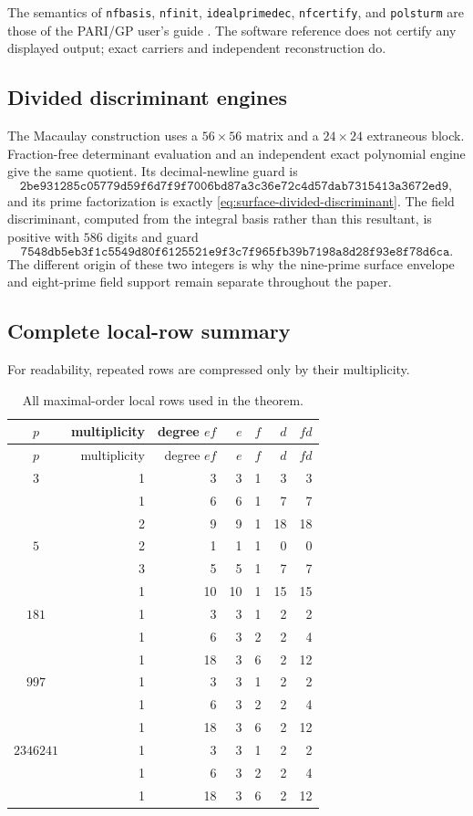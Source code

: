 The semantics of \texttt{nfbasis}, \texttt{nfinit},
\texttt{idealprimedec}, \texttt{nfcertify}, and \texttt{polsturm} are those
of the PARI/GP user's guide \citep{parigroup2021}.  The software reference
does not certify any displayed output; exact carriers and independent
reconstruction do.

\subsection{Divided discriminant engines}

The Macaulay construction uses a $56\times56$ matrix and a $24\times24$
extraneous block.  Fraction-free determinant evaluation and an independent
exact polynomial engine give the same quotient.  Its decimal-newline guard
is
\[
\texttt{2be931285c05779d59f6d7f9f7006bd87a3c36e72c4d57dab7315413a3672ed9},
\]
and its prime factorization is exactly
\cref{eq:surface-divided-discriminant}.  The field discriminant, computed
from the integral basis rather than this resultant, is positive with $586$
digits and guard
\[
\texttt{7548db5eb3f1c5549d80f6125521e9f3c7f965fb39b7198a8d28f93e8f78d6ca}.
\]
The different origin of these two integers is why the nine-prime surface
envelope and eight-prime field support remain separate throughout the paper.

\subsection{Complete local-row summary}

For readability, repeated rows are compressed only by their multiplicity.
\begin{longtable}{@{}c r r r r r r@{}}
\caption{All maximal-order local rows used in the theorem.}
\label{tab:appendix-local-rows}\\
\toprule
$p$&multiplicity&degree $ef$&$e$&$f$&$d$&$fd$\\
\midrule
\endfirsthead
\toprule
$p$&multiplicity&degree $ef$&$e$&$f$&$d$&$fd$\\
\midrule
\endhead
$3$&1&3&3&1&3&3\\
&1&6&6&1&7&7\\
&2&9&9&1&18&18\\
\midrule
$5$&2&1&1&1&0&0\\
&3&5&5&1&7&7\\
&1&10&10&1&15&15\\
\midrule
$181$&1&3&3&1&2&2\\
&1&6&3&2&2&4\\
&1&18&3&6&2&12\\
\midrule
$997$&1&3&3&1&2&2\\
&1&6&3&2&2&4\\
&1&18&3&6&2&12\\
\midrule
$2346241$&1&3&3&1&2&2\\
&1&6&3&2&2&4\\
&1&18&3&6&2&12\\
\bottomrule
\end{longtable}

